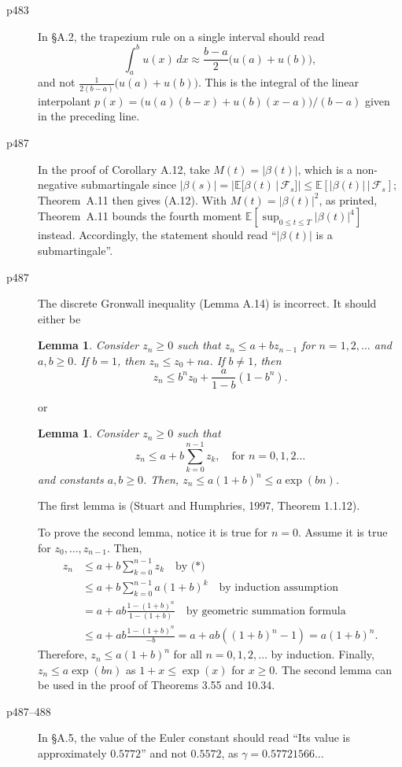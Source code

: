 \documentclass[final]{article}
\newtheorem{lemma}[theorem]{Lemma}
\theoremstyle{definition}
\begin{document}
 \begin{description}

     \item[p483] In \S A.2, the trapezium rule on a single interval
should read
\[
\int_a^b u(x)\,dx \approx \frac{b-a}{2}\bigl(u(a)+u(b)\bigr),
\]
and not $\frac{1}{2(b-a)}\bigl(u(a)+u(b)\bigr)$. This is the integral of the
linear interpolant $p(x)=\bigl(u(a)(b-x)+u(b)(x-a)\bigr)/(b-a)$ given in the
preceding line.

     \item[p487] In the proof of Corollary A.12, take $M(t)=|\beta(t)|$, which is a
non-negative submartingale since $|\beta(s)|=|\mathbb{E}[\beta(t)\,|\,\mathcal{F}_s]|\le
\mathbb{E}[|\beta(t)|\,|\,\mathcal{F}_s]$; Theorem~A.11 then gives (A.12). With
$M(t)=|\beta(t)|^2$, as printed, Theorem~A.11 bounds the fourth moment
$\mathbb{E}[\sup_{0\le t\le T}|\beta(t)|^4]$ instead. Accordingly, the statement should
read ``$|\beta(t)|$ is a submartingale''.

     \item[p487]
 The discrete Gronwall inequality (Lemma A.14) is incorrect. It should either be
\begin{lemma} Consider $z_n\ge 0$  such that $z_n\le a+bz_{n-1}$ for $n=1,2,\dots$  and $a,b\ge 0$. If $b=1$, then $z_n\le z_0+na$. If $b\ne 1$, then
\[
z_n\le b^n z_0+ \frac{a}{1-b}(1-b^n).
\]
\end{lemma}
or
\begin{lemma} Consider $z_n\ge 0$ such that 
\[
z_n\le a+b\sum_{k=0}^{n-1} z_k,\quad\text{for $n=0,1,2\dots$}\tag{*}
\]
and constants $a,b\ge0$. Then, $z_n\le a(1+b)^n\le a\exp(bn)$.
\end{lemma}
The first lemma is (Stuart and Humphries, 1997, Theorem 1.1.12).

To prove the second lemma, notice it is true for $n = 0$. Assume it is true for $z_0,\dots,z_{n-1}$. Then,
\begin{align*}
z_n& \le a+b\sum_{k=0}^{n-1} z_k \quad\text{by (*)}\\
&\le a+b \sum_{k=0}^{n-1}a(1+b)^k \quad\text{by induction assumption}\\
&= a+ab\frac{1-(1+b)^n}{1-(1+b)} \quad\text{by geometric summation formula}\\
&\le a+ab\frac{1-(1+b)^n}{-b}=a+ab((1+b)^n-1)=a(1+b)^n.
\end{align*}
Therefore, $z_n \le a(1 + b)^n$ 
for all $n = 0,1,2,\dots$ by induction. Finally, $z_n \le a \exp(bn)$ as $1 + x \le \exp(x)$ for
$x \ge 0$. The second lemma can be used in the proof of Theorems 3.55 and 10.34.

     \item[p487--488] In \S A.5, the value of the Euler constant
should read ``Its value is approximately $0.5772$'' and not $0.5572$, as
$\gamma=0.57721566\ldots$
 \end{description}
\end{document}
